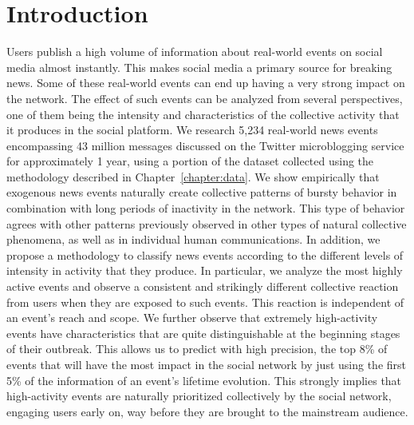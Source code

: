 \section{Introduction}

Users publish a high volume of information about real-world events on social
media almost instantly.
%
This makes social media a primary source for breaking news.
%
Some of these real-world events can end up having a very strong impact on the
network.  
%
The effect of such events can be analyzed from several perspectives, one of them
being the intensity and characteristics of the collective activity that it
produces in the social platform. 
%
We research 5,234 real-world news events encompassing 43 million messages
discussed on the Twitter microblogging service for approximately 1 year, using a
portion of the dataset collected using the methodology described in
Chapter~\ref{chapter:data}.
%
We show empirically that exogenous news events naturally create collective
patterns of bursty behavior in combination with long periods of inactivity in
the network. 
%
This type of behavior agrees with other patterns previously observed in other
types of natural collective phenomena, as well as in individual human
communications. 
%
In addition, we propose a methodology to classify news events according to the
different levels of intensity in activity that they produce. 
%
In particular, we analyze the most highly active events and observe a consistent
and strikingly different collective reaction from users when they are exposed to
such events. 
%
This reaction is independent of an event's reach and scope.  
%
We further observe that extremely high-activity events have characteristics that
are quite distinguishable at the beginning stages of their outbreak.  
%
This allows us to predict with high precision, the top 8\% of events that will
have the most impact in the social network by just using the first 5\% of the
information of an event's lifetime evolution. 
%
This strongly implies that high-activity events are naturally prioritized
collectively by the social network, engaging users early on, way before they are
brought to the mainstream audience.



